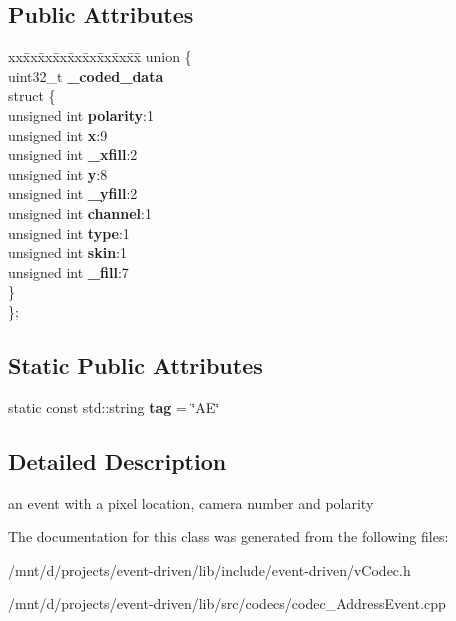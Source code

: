 \subsection*{Public Attributes}
\begin{DoxyCompactItemize}
\item 
\mbox{\label{classev_1_1AddressEvent_a359b9c530269e582a058112a34a48383}} 
\begin{tabbing}
xx\=xx\=xx\=xx\=xx\=xx\=xx\=xx\=xx\=\kill
union \{\\
\>uint32\_t {\bfseries \_coded\_data}\\
\mbox{\label{unionev_1_1AddressEvent_1_1_0D1_a51f7d79230871a81eca60e6fe852b2df}} 
\>struct \{\\
\>\>unsigned int {\bfseries polarity}:1\\
\>\>unsigned int {\bfseries x}:9\\
\>\>unsigned int {\bfseries \_xfill}:2\\
\>\>unsigned int {\bfseries y}:8\\
\>\>unsigned int {\bfseries \_yfill}:2\\
\>\>unsigned int {\bfseries channel}:1\\
\>\>unsigned int {\bfseries type}:1\\
\>\>unsigned int {\bfseries skin}:1\\
\>\>unsigned int {\bfseries \_fill}:7\\
\>\} \\
\}; \\

\end{tabbing}\end{DoxyCompactItemize}
\subsection*{Static Public Attributes}
\begin{DoxyCompactItemize}
\item 
\mbox{\label{classev_1_1AddressEvent_a9a2d3e863964a1247ae4203a4ad2c646}} 
static const std\+::string {\bfseries tag} = \char`\"{}AE\char`\"{}
\end{DoxyCompactItemize}


\subsection{Detailed Description}
an event with a pixel location, camera number and polarity 

The documentation for this class was generated from the following files\+:\begin{DoxyCompactItemize}
\item 
/mnt/d/projects/event-\/driven/lib/include/event-\/driven/v\+Codec.\+h\item 
/mnt/d/projects/event-\/driven/lib/src/codecs/codec\+\_\+\+Address\+Event.\+cpp\end{DoxyCompactItemize}
